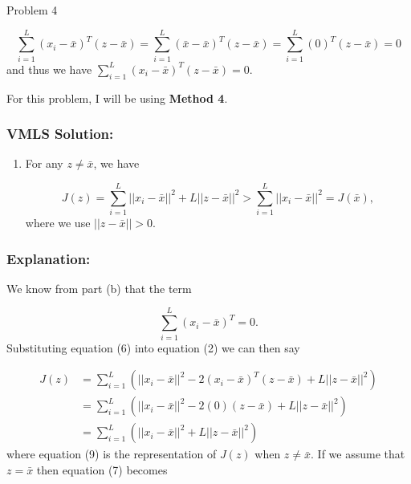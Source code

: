 \begin{problem}{Problem 4}
\begin{highlight}
        \begin{equation}
            \sum^{L}_{i = 1} (x_{i} - \bar{x})^{T}(z - \bar{x}) = \sum^{L}_{i = 1} (\bar{x} - \bar{x})^{T}(z - \bar{x}) = \sum^{L}_{i = 1} (0)^{T}(z - \bar{x}) = 0
        \end{equation}
        and thus we have $\sum^{L}_{i = 1}(x_{i} - \bar{x})^{T}(z - \bar{x}) = 0$.
    \end{highlight}

    \begin{highlight}
        \noindent For this problem, I will be using \textbf{Method 4}. 

        \subsubsection*{VMLS Solution:}

        \begin{enumerate}[label = (\alph*), start = 3]
            \item For any $z \neq \bar{x}$, we have
            
            \begin{equation*}
                J(z) = \sum^{L}_{i = 1}||x_{i} - \bar{x}||^{2} + L||z - \bar{x}||^{2} > \sum^{L}_{i = 1} ||x_{i} - \bar{x}||^{2} = J(\bar{x}),
            \end{equation*}
            where we use $||z - \bar{x}|| > 0$.
        \end{enumerate}

        \subsubsection*{Explanation:}

        We know from part (b) that the term 

        \begin{equation}
            \sum^{L}_{i = 1} (x_{i} - \bar{x})^{T} = 0.
        \end{equation}
        Substituting equation (6) into equation (2) we can then say 

        \begin{align}
            J(z) & = \sum^{L}_{i = 1} (||x_{i} - \bar{x}||^{2} - 2(x_{i} - \bar{x})^{T}(z - \bar{x}) + L||z - \bar{x}||^{2}) \\
            & = \sum^{L}_{i = 1} (||x_{i} - \bar{x}||^{2} - 2(0)(z - \bar{x}) + L||z - \bar{x}||^{2}) \\
            & = \sum^{L}_{i = 1} (||x_{i} - \bar{x}||^{2} + L||z - \bar{x}||^{2})
        \end{align}
        where equation (9) is the representation of $J(z)$ when $z \neq \bar{x}$. If we assume that $z = \bar{x}$ then equation (7) becomes 


\end{highlight}
\end{problem}
